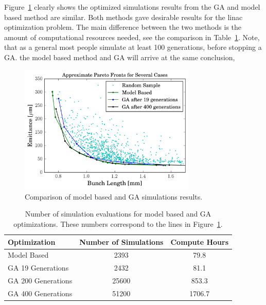 Figure~\ref{fig:GAvsModel} clearly shows the optimized simulations results from 
the GA and model based method are similar. Both methods gave desirable 
results for the linac optimization problem. 
The main difference between the two methods is the amount of computational 
resources needed, see the comparison in Table~\ref{tab:optcompare}.
Note, that as a general  most people simulate at least 100 generations, before stopping a GA.
 the model based method and GA will arrive at 
the same conclusion, 
\begin{figure}
	\centering
	\includegraphics[width=0.75\textwidth]{./images/model_vs_ga}
	\caption{Comparison of model based and GA simulations results.}
	\label{fig:GAvsModel}
\end{figure}
\begin{table}[h] %
	\caption{Number of simulation evaluations for model based and GA optimizations.
	These numbers correspond to the lines in Figure~\ref{fig:GAvsModel}.}
	\label{tab:optcompare}
	\begin{center}
		\begin{tabular}{lcc}
			\toprule
			\toprule
			\textbf{Optimization} & \textbf{Number of Simulations} & \textbf{Compute Hours} \\
			\midrule
			Model Based  		& 2393  & 79.8 \\
			GA 19 Generations 	& 2432  & 81.1 \\
			GA 200 Generations 	& 25600 & 853.3\\
			GA 400 Generations 	& 51200 & 1706.7\\
			\bottomrule
		\end{tabular}
	\end{center}
\end{table}


